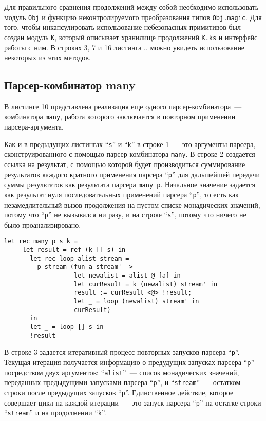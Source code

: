 Для правильного сравнения продолжений между собой необходимо использовать модуль \lstinline|Obj| и функцию неконтролируемого преобразования типов \lstinline|Obj.magic|. Для того, чтобы инкапсулировать использование небезопасных примитивов был создан модуль \lstinline|K|, который описывает хранилище продолжений \lstinline|K.ks| и интерфейс работы с ним. В строках 3, 7 и 16 листинга .. можно увидеть использование некоторых из этих методов.

\subsection{Парсер-комбинатор many}

В листинге 10 представлена реализация еще одного парсер-комбинатора~--- комбинатора \lstinline|many|, работа которого заключается в повторном применении парсера-аргумента.

Как и в предыдущих листингах ``\lstinline|s|'' и ``\lstinline|k|'' в строке 1~--- это аргументы парсера, сконструированного с помощью парсер-комбинатора \lstinline|many|. В строке 2 создается ссылка на результат, с помощью которой будет производиться суммирование результатов каждого кратного применения парсера ``\lstinline|р|'' для дальшейшей передачи суммы результатов как результата парсера \lstinline|many p|. Начальное значение задается как результат нуля последовательных применений парсера ``\lstinline|р|'', то есть как незамедлительный вызов продолжения на пустом списке монадических значений, потому что ``\lstinline|р|'' не вызывался ни разу, и на строке ``\lstinline|s|'', потому что ничего не было проанализировано.

\begin{lstlisting}[basicstyle=\small, caption=Парсер-комбинатор many]
   let rec many p s k =
     let result = ref (k [] s) in
       let rec loop alist stream =
         p stream (fun a stream' ->
                   let newalist = alist @ [a] in
                   let curResult = k (newalist) stream' in
                   result := curResult <@> !result;
                   let _ = loop (newalist) stream' in
                   curResult)
       in
       let _ = loop [] s in
       !result
\end{lstlisting}

В строке 3 задается итеративный процесс повторных запусков парсера ``\lstinline|р|''. Текущая итерация получается информацию о предудущих запусках парсера ``\lstinline|р|'' посредством двух аргументов: ``\lstinline|alist|''~--- список монадических значений, переданных предыдущими запусками парсера ``\lstinline|p|'', и ``\lstinline|stream|''~--- остатком строки после предыдущих запусков ``\lstinline|p|''. Единственное действие, которое совершает цикл на каждой итерации~--- это запуск парсера ``\lstinline|р|'' на остатке строки ``\lstinline|stream|'' и на продолжении ``\lstinline|k|''.

